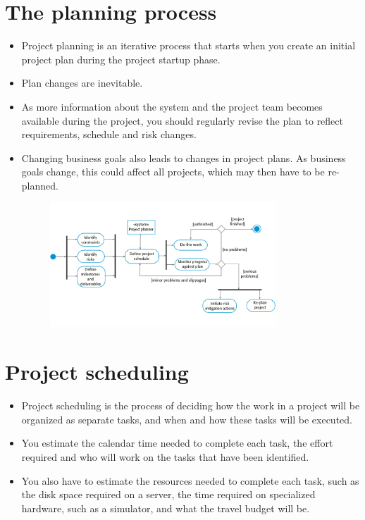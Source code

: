 \section{The planning process}
\begin{itemize}

\item Project planning is an iterative process that starts when you create an initial project plan during the project startup phase.

\item Plan changes are inevitable.

  \item As more information about the system and the project team becomes available during the project, you should regularly revise the plan to reflect requirements, schedule and risk changes.
  \item Changing business goals also leads to changes in project plans. As business goals change, this could affect all projects, which may then have to be re-planned.
  \begin{figure}[h!]
      \centering
      \includegraphics[width = 0.8\textwidth]{./figures/L6_1.png}
      \caption{}
      \label{fig:L6_1}
  \end{figure}

\end{itemize}
\section{Project scheduling}
\begin{itemize}

\item Project scheduling is the process of deciding how the work in a project will be organized as separate tasks, and when and how these tasks will be executed.

\item You estimate the calendar time needed to complete each task, the effort required and who will work on the tasks that have been identified.

\item You also have to estimate the resources needed to complete each task, such as the disk space required on a server, the time required on specialized hardware, such as a simulator, and what the travel budget will be.
\end{itemize}
